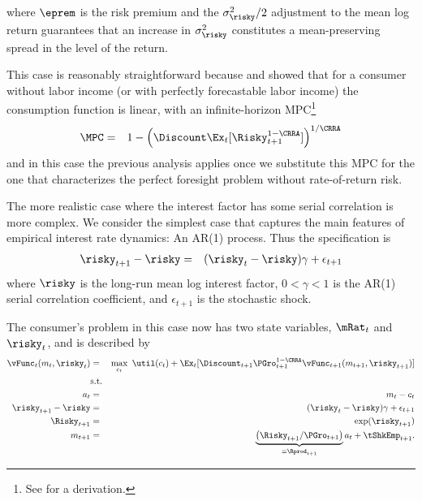 \documentclass[titlepage]{\econtex}
\begin{document}
where $\eprem$ is the risk premium and the $\sigma^{2}_{\risky}/2$ adjustment to the mean log return
guarantees that an increase in $\sigma^{2}_{\risky}$ constitutes a mean-preserving spread in the level of the return.  

This case is reasonably straightforward because \cite{merton:restat} and \cite{samuelson:portfolio} showed
that for a consumer without labor income (or with perfectly forecastable labor income) the consumption
function is linear, with an infinite-horizon MPC\footnote{See  for a derivation.}
\begin{eqnarray}
  \MPC & = & 1- \left(\Discount  \Ex_{t}[\Risky_{t+1}^{1-\CRRA}]\right)^{1/\CRRA} \label{eq:MPCExact}
\end{eqnarray}
and in this case the previous analysis applies once we substitute this MPC for the one that characterizes 
the perfect foresight problem without rate-of-return risk.  

The more realistic case where the interest factor has some serial correlation is more complex.  We consider 
the simplest case that captures the main features of empirical interest rate dynamics: An AR(1) process.  Thus
the specification is 
\begin{eqnarray}
  \risky_{t+1}-\risky & = & (\risky_{t}-\risky) \gamma + \epsilon_{t+1} 
\end{eqnarray}
where $\risky$ is the long-run mean log interest factor, $0 < \gamma < 1$ is the AR(1) serial correlation
coefficient, and $\epsilon_{t+1}$ is the stochastic shock.  

The consumer's problem in this case now has two state variables, $\mRat_{t}$ and $\risky_{t}$, and 
is described by
\begin{eqnarray}
        \null{\vFunc}_{t}({m}_{t},\risky_{t}) & = & \max_{{c}_{t}} ~ \util({c}_{t})+
        \Ex_{t}[{\Discount}_{t+1}\PGro_{t+1}^{1-\CRRA}\null{\vFunc}_{t+1}({m}_{t+1},\risky_{t+1})] \label{vtNormRisky}
\\         & \text{s.t.} &   \nonumber \\
    {a}_{t}   & = & {m}_{t}-{c}_{t} \nonumber
\\      \risky_{t+1}-\risky & = & (\risky_{t}-\risky)\gamma + \epsilon_{t+1} \notag
\\      \Risky_{t+1} & = & \exp(\risky_{t+1}) \notag
\\      {m}_{t+1} & = & \underbrace{\left(\Risky_{t+1}/\PGro_{t+1}\right)}_{\equiv \Rprod_{t+1}}{a}_{t}+\tShkEmp_{t+1} \nonumber.
\end{eqnarray}
\end{document}

